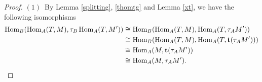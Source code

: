 \documentclass[reqno,12pt]{amsart}
\numberwithin{equation}{section}
\theoremstyle{plain}
\theoremstyle{definition}
\begin{document}
\begin{proof}
$(1)$~By Lemma \ref{splitting}, \eqref{thomtg} and Lemma \ref{xt}, we have the following isomorphisms
\begin{equation*}
\begin{split}
 \operatorname{Hom}_B ( \operatorname{Hom}_A(T,M) , \tau_{B}\operatorname{Hom}_A(T,M') )
& \cong \operatorname{Hom}_B ( \operatorname{Hom}_A(T,M) , \operatorname{Hom}_A(T,\tau_{A} M') ) \\
& \cong \operatorname{Hom}_B ( \operatorname{Hom}_A(T,M) , \operatorname{Hom}_A(T, {\bf t}(\tau_{A} M')) ) \\
& \cong \operatorname{Hom}_A(M, {\bf t}(\tau_{A} M')) \\
& \cong \operatorname{Hom}_A(M, \tau_{A} M').
\end{split}
\end{equation*}


\end{proof}
\end{document}
